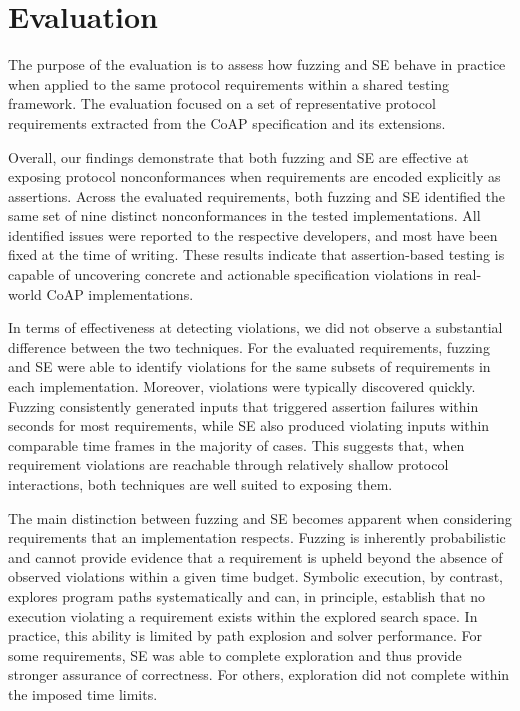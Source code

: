 \section{Evaluation}
The purpose of the evaluation is to assess how fuzzing and SE behave in practice when applied to the same protocol requirements within a shared testing framework.
The evaluation focused on a set of representative protocol requirements extracted from the CoAP specification and its extensions.

Overall, our findings demonstrate that both fuzzing and SE are effective at exposing protocol nonconformances when requirements are encoded explicitly as assertions.
Across the evaluated requirements, both fuzzing and SE identified the same set of nine distinct nonconformances in the tested implementations.
All identified issues were reported to the respective developers, and most have been fixed at the time of writing.
These results indicate that assertion-based testing is capable of uncovering concrete and actionable specification violations in real-world CoAP implementations.

In terms of effectiveness at detecting violations, we did not observe a substantial difference between the two techniques.
For the evaluated requirements, fuzzing and SE were able to identify violations for the same subsets of requirements in each implementation.
Moreover, violations were typically discovered quickly.
Fuzzing consistently generated inputs that triggered assertion failures within seconds for most requirements, while SE also produced violating inputs within comparable time frames in the majority of cases.
This suggests that, when requirement violations are reachable through relatively shallow protocol interactions, both techniques are well suited to exposing them.

The main distinction between fuzzing and SE becomes apparent when considering requirements that an implementation respects.
Fuzzing is inherently probabilistic and cannot provide evidence that a requirement is upheld beyond the absence of observed violations within a given time budget.
Symbolic execution, by contrast, explores program paths systematically and can, in principle, establish that no execution violating a requirement exists within the explored search space.
In practice, this ability is limited by path explosion and solver performance.
For some requirements, SE was able to complete exploration and thus provide stronger assurance of correctness.
For others, exploration did not complete within the imposed time limits.

